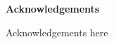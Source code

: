 \begingroup%
\makeatletter%
\cleardoublepage%
\let\newpage\relax%
\let\clearpage\relax%
\vspace*{\fill}%
\vspace*{\dimexpr-50\p@-\baselineskip}%
\begin{center}
\huge \textbf{Acknowledgements}
\end{center}
Acknowledgements here
\vspace*{\fill}%
\endgroup%



